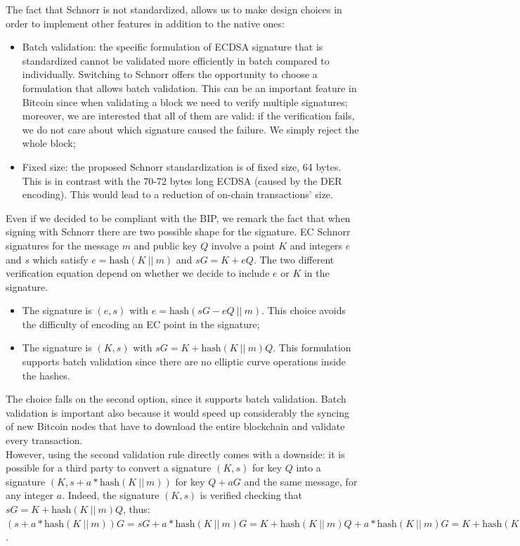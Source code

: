 \bigskip
\noindent
The fact that Schnorr is not standardized, allows us to make design choices in order to implement other features in addition to the native ones:
\begin{itemize}
	\item Batch validation: the specific formulation of ECDSA signature that is standardized cannot be validated more efficiently in batch compared to individually. Switching to Schnorr offers the opportunity to choose a formulation that allows batch validation. This can be an important feature in Bitcoin since when validating a block we need to verify multiple signatures; moreover, we are interested that all of them are valid: if the verification fails, we do not care about which signature caused the failure. We simply reject the whole block;
	\item Fixed size: the proposed Schnorr standardization is of fixed size, 64 bytes. This is in contrast with the 70-72 bytes long ECDSA (caused by the DER encoding). This would lead to a reduction of on-chain transactions' size.
\end{itemize}
Even if we decided to be compliant with the BIP, we remark the fact that when signing with Schnorr there are two possible shape for the signature. EC Schnorr signatures for the message $m$ and public key $Q$ involve a point $K$ and integers $e$ and $s$ which satisfy $e = \text{hash}(K \ || \ m)$ and $sG = K + eQ$. The two different verification equation depend on whether we decide to include $e$ or $K$ in the signature.
\begin{itemize}
	\item The signature is $(e, s)$ with $e = \text{hash}(sG - eQ \ || \ m)$. This choice avoids the difficulty of encoding an EC point in the signature;
	\item The signature is $(K, s)$ with $sG = K + \text{hash}(K \ || \ m)Q$. This formulation supports batch validation since there are no elliptic curve operations inside the hashes.
\end{itemize}
The choice falls on the second option, since it supports batch validation. Batch validation is important also because it would speed up considerably the syncing of new Bitcoin nodes that have to download the entire blockchain and validate every transaction.
\\
However, using the second validation rule directly comes with a downside: it is possible for a third party to convert a signature $(K, s)$ for key $Q$ into a signature $(K, s + a*\text{hash}(K \ || \ m))$ for key $Q + aG$ and the same message, for any integer $a$. Indeed, the signature $(K, s)$ is verified checking that $sG = K + \text{hash}(K \ || \ m)Q$, thus: $(s + a*\text{hash}(K \ || \ m))G = sG + a*\text{hash}(K \ || \ m)G = K + \text{hash}(K \ || \ m)Q + a*\text{hash}(K \ || \ m)G = K + \text{hash}(K \ || \ m)(Q + aG)$.
